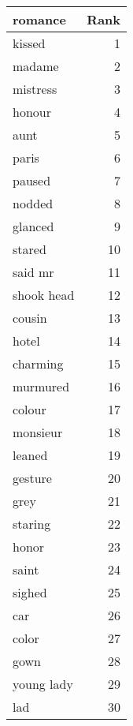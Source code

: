 \begin{table}
\label{tab:romance_terms}
\begin{tabular}{lr}
\toprule
romance & Rank \\
\midrule
kissed & 1 \\
madame & 2 \\
mistress & 3 \\
honour & 4 \\
aunt & 5 \\
paris & 6 \\
paused & 7 \\
nodded & 8 \\
glanced & 9 \\
stared & 10 \\
said mr & 11 \\
shook head & 12 \\
cousin & 13 \\
hotel & 14 \\
charming & 15 \\
murmured & 16 \\
colour & 17 \\
monsieur & 18 \\
leaned & 19 \\
gesture & 20 \\
grey & 21 \\
staring & 22 \\
honor & 23 \\
saint & 24 \\
sighed & 25 \\
car & 26 \\
color & 27 \\
gown & 28 \\
young lady & 29 \\
lad & 30 \\
\bottomrule
\end{tabular}
\end{table}
